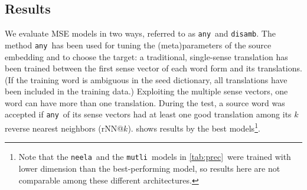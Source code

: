 \documentclass[11pt]{article}
\newcommand{\neelakantan}{\texttt{neela}}
\newcommand{\mutli}{\texttt{mutli}}
\newcommand{\any}{\texttt{any}}
\newcommand{\disamb}{\texttt{disamb}}
\newcommand{\todo}[1]{}
\begin{document}
\subsection{Results}

\label{sec:res}


We evaluate MSE models in two ways, referred to as \any~and \disamb.  The method
\any~has been used for tuning the (meta)parameters of the source embedding and
to choose the target: a traditional, single-sense translation has been trained
between the first\todo{all} sense vector of each word form and its
translations. (If the training word is ambiguous in the seed dictionary, all
translations have been included in the training data.)  Exploiting the multiple
sense vectors, one word can have more than one translation.  During the test, a
source word was accepted if \any~\todo{the 1st}of its sense vectors had at
least one good translation among its $k$ reverse nearest neighbors (rNN@$k$).
 shows results by the best models\footnote{ Note that the
\neelakantan~and the \mutli~models in \cref{tab:prec}~were trained with lower
dimension than the best-performing model, so results here are not comparable
among these different architectures.}.
\end{document}
